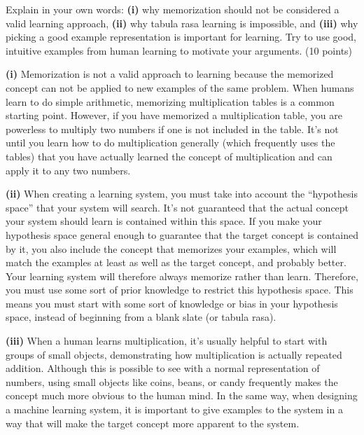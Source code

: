 \documentclass[fleqn]{homework}
\begin{document}
  \maketitle

  \begin{problem}{1}
    \begin{question}
      Explain in your own words: \textbf{(i)} why memorization should not be
      considered a valid learning approach, \textbf{(ii)} why tabula rasa
      learning is impossible, and \textbf{(iii)} why picking a good example
      representation is important for learning.  Try to use good, intuitive
      examples from human learning to motivate your arguments. (10 points)
    \end{question}

    \textbf{(i)} Memorization is not a valid approach to learning because the
    memorized concept can not be applied to new examples of the same problem.
    When humans learn to do simple arithmetic, memorizing multiplication tables
    is a common starting point.  However, if you have memorized a multiplication
    table, you are powerless to multiply two numbers if one is not included in
    the table.  It's not until you learn how to do multiplication generally
    (which frequently uses the tables) that you have actually learned the
    concept of multiplication and can apply it to any two numbers.

    \textbf{(ii)} When creating a learning system, you must take into account
    the ``hypothesis space'' that your system will search.  It's not guaranteed
    that the actual concept your system should learn is contained within this
    space.  If you make your hypothesis space general enough to guarantee that
    the target concept is contained by it, you also include the concept that
    memorizes your examples, which will match the examples at least as well as
    the target concept, and probably better.  Your learning system will
    therefore always memorize rather than learn.  Therefore, you must use some
    sort of prior knowledge to restrict this hypothesis space.  This means you
    must start with some sort of knowledge or bias in your hypothesis space,
    instead of beginning from a blank slate (or tabula rasa).

    \textbf{(iii)} When a human learns multiplication, it's usually helpful to
    start with groups of small objects, demonstrating how multiplication is
    actually repeated addition.  Although this is possible to see with a normal
    representation of numbers, using small objects like coins, beans, or candy
    frequently makes the concept much more obvious to the human mind.  In the
    same way, when designing a machine learning system, it is important to give
    examples to the system in a way that will make the target concept more
    apparent to the system.
  \end{problem}
\end{document}
